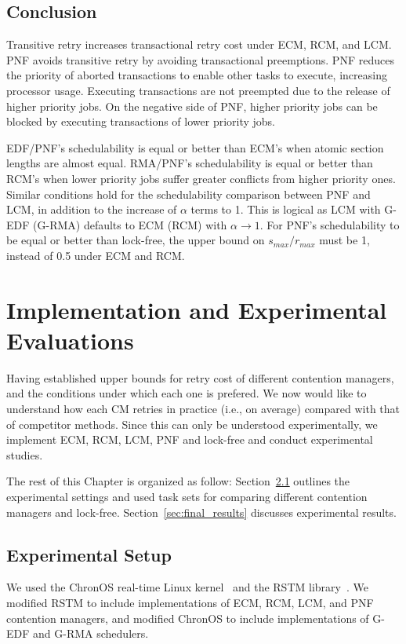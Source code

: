 \documentclass[12pt,english]{report}
\begin{document}
\section{Conclusion}\label{pnf_conclusion}

Transitive retry increases transactional retry cost under ECM, RCM, and LCM. PNF avoids transitive retry by avoiding   transactional preemptions. PNF reduces the priority of aborted transactions to enable other tasks to execute, increasing processor usage. Executing transactions are not preempted due to the release of higher priority jobs. On the negative side of PNF, higher priority jobs can be blocked by executing transactions of lower priority jobs. 

EDF/PNF's schedulability is equal or better than ECM's when atomic section lengths are almost equal. RMA/PNF's schedulability is equal or better than RCM's when lower priority jobs suffer greater conflicts from higher priority ones. Similar conditions hold for the schedulability comparison between PNF and LCM, in addition to the increase of $\alpha$ terms to 1. This is logical as LCM with G-EDF (G-RMA) defaults to ECM (RCM) with $\alpha\rightarrow 1$. For PNF's schedulability to be equal or better than lock-free, the upper bound on $s_{max}/r_{max}$ must be 1, instead of 0.5 under ECM and RCM. 



\chapter{\label{ch_exp}Implementation and Experimental Evaluations}

Having established upper bounds for retry cost of different contention managers, and the conditions under which each one is prefered. We now would like to understand how each CM retries in practice (i.e., on average) compared with that of competitor methods. Since this can only be understood experimentally, we implement ECM, RCM, LCM, PNF and lock-free and conduct experimental studies.

The rest of this Chapter is organized as follow: Section~\ref{sec:experimental_setup} outlines the experimental settings and used task sets for comparing different contention managers and lock-free. Section~\ref{sec:final_results} discusses experimental results.

\section{Experimental Setup}\label{sec:experimental_setup}
We used the ChronOS real-time Linux kernel~\cite{dellinger2011chronos}
and the RSTM library~\cite{marathe2006lowering}. We modified RSTM to include implementations of ECM, RCM, LCM, and PNF contention managers, and modified ChronOS to include implementations of G-EDF and G-RMA schedulers. 
\end{document}
